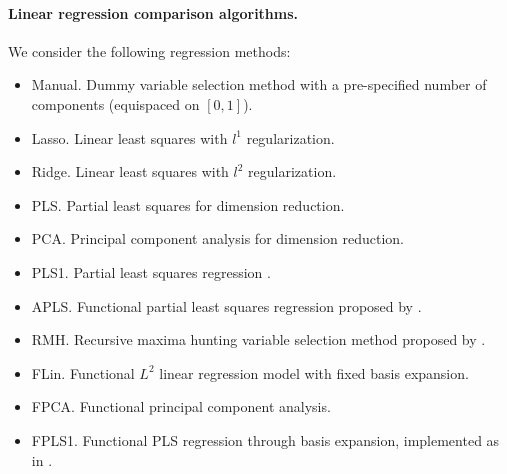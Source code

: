 \paragraph{Linear regression comparison algorithms.} We consider the following regression methods:
\begin{itemize}
  \item Manual.\hspace{.3em} Dummy variable selection method with a pre-specified number of components (equispaced on \([0, 1]\)).
  \item Lasso.\hspace{.3em} Linear least squares with \(l^1\) regularization.
  \item Ridge.\hspace{.3em} Linear least squares with \(l^2\) regularization.
  \item PLS.\hspace{.3em} Partial least squares for dimension reduction.
  \item PCA.\hspace{.3em} Principal component analysis for dimension reduction.
  \item PLS1.\hspace{.3em} Partial least squares regression \citep[e.g.][]{wegelin2000survey}.
  \item APLS.\hspace{.3em} Functional partial least squares regression proposed by \citet{delaigle2012methodology}.
  \item RMH.\hspace{.3em} Recursive maxima hunting variable selection method proposed by \citet{torrecilla2016feature}.
  \item FLin.\hspace{.3em} Functional \(L^2\) linear regression model with fixed basis expansion.
  \item FPCA.\hspace{.3em} Functional principal component analysis.
  \item FPLS1.\hspace{.3em} Functional PLS regression through basis expansion, implemented as in \citet{aguilera2010using}.
\end{itemize}

